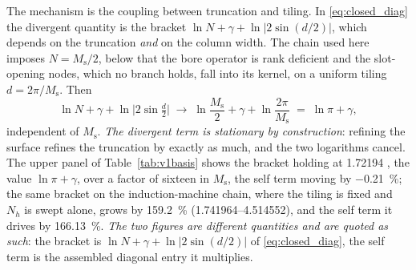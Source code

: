 \documentclass[10pt,a4paper,twocolumn]{article}
\theoremstyle{plain}
\theoremstyle{remark}
\begin{document}
The mechanism is the coupling between truncation and tiling. In
\eqref{eq:closed_diag} the divergent quantity is the bracket
$\ln N+\gamma+\ln|2\sin(d/2)|$, which depends on the truncation
\emph{and} on the column width. The chain used here imposes
$N=M_{\mathrm{s}}/2$, below that the bore operator is rank deficient
and the slot-opening nodes, which no branch holds, fall into its
kernel, on a uniform tiling $d=2\pi/M_{\mathrm{s}}$. Then
\begin{equation}
\ln N+\gamma+\ln\bigl|2\sin\tfrac{d}{2}\bigr|
\;\longrightarrow\;
\ln\frac{M_{\mathrm{s}}}{2}+\gamma+\ln\frac{2\pi}{M_{\mathrm{s}}}
\;=\;\ln\pi+\gamma ,
\label{eq:lock}
\end{equation}
independent of $M_{\mathrm{s}}$. \emph{The divergent term is stationary
by construction}: refining the surface refines the truncation by exactly
as much, and the two logarithms cancel. The upper panel of
Table~\ref{tab:v1basis} shows the bracket holding at \num{1.72194}
, the value $\ln\pi+\gamma$, over a factor of sixteen in
$M_{\mathrm{s}}$, the self term moving by \SI{-0.21}{\percent}; the
same bracket on the induction-machine chain, where the tiling is fixed
and $N_h$ is swept alone, grows by \SI{159.2}{\percent}
(\numrange{1.741964}{4.514552}), and the self term it drives by
\SI{166.13}{\percent}. \emph{The two figures are different quantities
and are quoted as such}: the bracket is
$\ln N+\gamma+\ln\lvert2\sin(d/2)\rvert$ of \eqref{eq:closed_diag}, the self
term is the assembled diagonal entry it multiplies.
\end{document}
